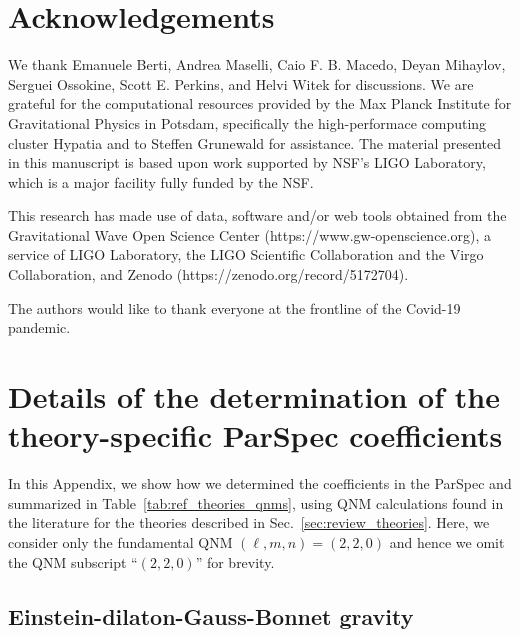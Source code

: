 \documentclass[twocolumn,
               prd,
               aps,
               superscriptaddress,
               tightenlines,
               nofootinbib,
               eqsecnum,
               amsfonts,
               amsmath,
               longbibliography]{revtex4-1}
\begin{document}

\section*{Acknowledgements}
\label{sec:acknowledgements}
%
We thank Emanuele Berti, Andrea Maselli, Caio F. B. Macedo, Deyan Mihaylov,
Serguei Ossokine, Scott E. Perkins, and Helvi Witek for discussions.
%
We are grateful for the computational resources provided by the Max Planck
Institute for Gravitational Physics in Potsdam, specifically the
high-performace computing cluster Hypatia and to Steffen Grunewald for
assistance.
%
The material presented in this manuscript is based upon work supported by NSF’s LIGO Laboratory,
which is a major facility fully funded by the NSF.
%

This research has made use of data, software and/or web tools obtained from the Gravitational Wave Open
Science Center (https://www.gw-openscience.org), a service of LIGO Laboratory, the LIGO Scientific Collaboration
and the Virgo Collaboration, and Zenodo (https://zenodo.org/record/5172704).
%

The authors would like to thank everyone at the frontline of the Covid-19
pandemic.

\appendix

\section{Details of the determination of the theory-specific ParSpec coefficients}
\label{app:map_details}

In this Appendix, we show how we determined the coefficients in the ParSpec
and summarized in Table~\ref{tab:ref_theories_qnms},
using QNM calculations found in the literature for the theories described in
Sec.~\ref{sec:review_theories}.
%
Here, we consider only the fundamental QNM $(\ell, m, n) = (2, 2, 0)$ and
hence we omit the QNM subscript ``$(2,2,0)$'' for brevity.

\subsection{Einstein-dilaton-Gauss-Bonnet gravity}
\label{app:map_edgb}
\end{document}
